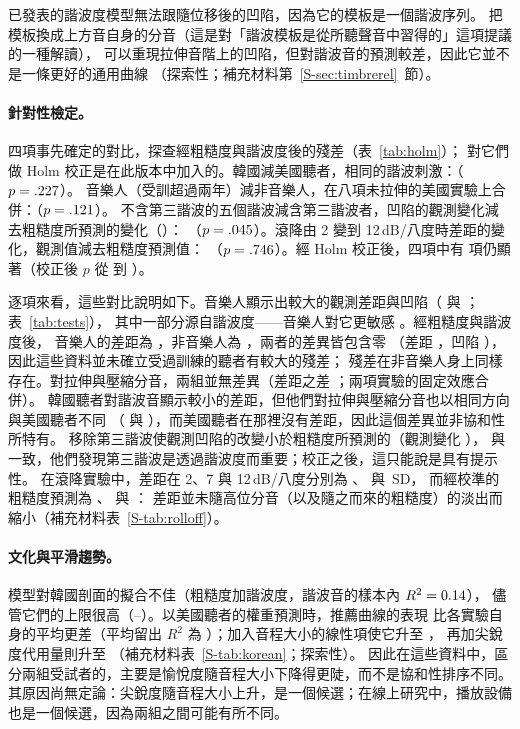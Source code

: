\documentclass[11pt,a4paper]{article}
\newcommand{\SDu}{\,SD}
\begin{document}
已發表的諧波度模型無法跟隨位移後的凹陷，因為它的模板是一個諧波序列。
把模板換成上方音自身的分音（這是對「諧波模板是從所聽聲音中習得的」這項提議 \citep{shamma2000} 的一種解讀），
可以重現拉伸音階上的凹陷，但對諧波音的預測較差，因此它並不是一條更好的通用曲線
（探索性；補充材料第~\ref{S-sec:timbrerel}~節）。

\paragraph{針對性檢定。}
四項事先確定的對比，探查經粗糙度與諧波度後的殘差（表~\ref{tab:holm}）；
對它們做 Holm 校正是在此版本中加入的。韓國減美國聽者，相同的諧波刺激：\holmEstCulture{}（$p=.227$）。
音樂人（受訓超過兩年）減非音樂人，在八項未拉伸的美國實驗上合併：\holmEstMus{}（$p=.121$）。
不含第三諧波的五個諧波減含第三諧波者，凹陷的觀測變化減去粗糙度所預測的變化（\nthreeHKDip）：
\holmEstThird{}（$p=.045$）。滾降由 2 變到 12\,dB/八度時差距的變化，觀測值減去粗糙度預測值：
\holmEstRoll{}（$p=.746$）。經 Holm 校正後，四項中有 \holmNsurvive{} 項仍顯著（校正後 $p$ 從 \holmPadjThird{} 到 \holmPadjRoll）。

逐項來看，這些對比說明如下。音樂人顯示出較大的觀測差距與凹陷（\musPoolGap{} 與 \musPoolDip；表~\ref{tab:tests}），
其中一部分源自諧波度——音樂人對它更敏感 \citep{mcdermott2010}。經粗糙度與諧波度後，
音樂人的差距為 \grpMusGapHKH{}，非音樂人為 \grpNonGapHKH，兩者的差異皆包含零
（差距 \musPoolGapHKH，凹陷 \musPoolDipHKH），因此這些資料並未確立受過訓練的聽者有較大的殘差；
殘差在非音樂人身上同樣存在。對拉伸與壓縮分音，兩組並無差異（差距之差 \musPoolStrGap；兩項實驗的固定效應合併）。
韓國聽者對諧波音顯示較小的差距，但他們對拉伸與壓縮分音也以相同方向與美國聽者不同
（\cohObsGapStr{} 與 \cohObsGapComp），而美國聽者在那裡沒有差距，因此這個差異並非協和性所特有。
移除第三諧波使觀測凹陷的改變小於粗糙度所預測的（觀測變化 \nthreeObsDip），
與 \citet{marjieh2024} 一致，他們發現第三諧波是透過諧波度而重要；校正之後，這只能說是具有提示性。
在滾降實驗中，差距在 2、7 與 12\,dB/八度分別為 \rollTwoGap、\rollSevenGap{} 與 \rollTwelveGap\SDu，
而經校準的粗糙度預測為 \rollTwoHKpred、\rollSevenHKpred{} 與 \rollTwelveHKpred：
差距並未隨高位分音（以及隨之而來的粗糙度）的淡出而縮小（補充材料表~\ref{S-tab:rolloff}）。

\paragraph{文化與平滑趨勢。}
模型對韓國剖面的擬合不佳（粗糙度加諧波度，諧波音的樣本內 $R^2=0.14$），
儘管它們的上限很高（\krCeilMin--\krCeilMax）。以美國聽者的權重預測時，推薦曲線的表現
比各實驗自身的平均更差（平均留出 $R^2$ 為 \krHoTw）；加入音程大小的線性項使它升至 \krHoSize，
再加尖銳度代用量則升至 \krHoSharp（補充材料表~\ref{S-tab:korean}；探索性）。
因此在這些資料中，區分兩組受試者的，主要是愉悅度隨音程大小下降得更陡，而不是協和性排序不同。
其原因尚無定論：尖銳度隨音程大小上升，是一個候選；在線上研究中，播放設備也是一個候選，因為兩組之間可能有所不同。
\end{document}

